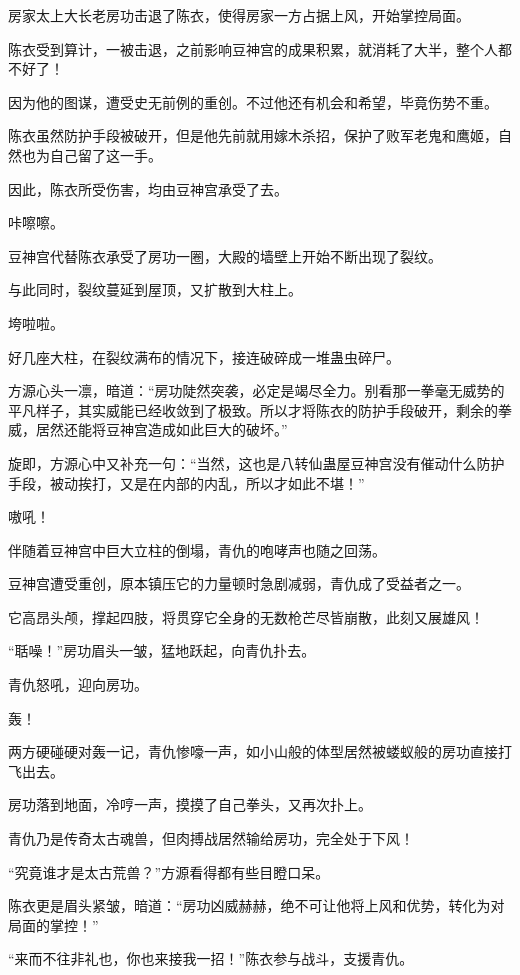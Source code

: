 \begin{this_body}
房家太上大长老房功击退了陈衣，使得房家一方占据上风，开始掌控局面。

陈衣受到算计，一被击退，之前影响豆神宫的成果积累，就消耗了大半，整个人都不好了！

因为他的图谋，遭受史无前例的重创。不过他还有机会和希望，毕竟伤势不重。

陈衣虽然防护手段被破开，但是他先前就用嫁木杀招，保护了败军老鬼和鹰姬，自然也为自己留了这一手。

因此，陈衣所受伤害，均由豆神宫承受了去。

咔嚓嚓。

豆神宫代替陈衣承受了房功一圈，大殿的墙壁上开始不断出现了裂纹。

与此同时，裂纹蔓延到屋顶，又扩散到大柱上。

垮啦啦。

好几座大柱，在裂纹满布的情况下，接连破碎成一堆蛊虫碎尸。

方源心头一凛，暗道：“房功陡然突袭，必定是竭尽全力。别看那一拳毫无威势的平凡样子，其实威能已经收敛到了极致。所以才将陈衣的防护手段破开，剩余的拳威，居然还能将豆神宫造成如此巨大的破坏。”

旋即，方源心中又补充一句：“当然，这也是八转仙蛊屋豆神宫没有催动什么防护手段，被动挨打，又是在内部的内乱，所以才如此不堪！”

嗷吼！

伴随着豆神宫中巨大立柱的倒塌，青仇的咆哮声也随之回荡。

豆神宫遭受重创，原本镇压它的力量顿时急剧减弱，青仇成了受益者之一。

它高昂头颅，撑起四肢，将贯穿它全身的无数枪芒尽皆崩散，此刻又展雄风！

“聒噪！”房功眉头一皱，猛地跃起，向青仇扑去。

青仇怒吼，迎向房功。

轰！

两方硬碰硬对轰一记，青仇惨嚎一声，如小山般的体型居然被蝼蚁般的房功直接打飞出去。

房功落到地面，冷哼一声，摸摸了自己拳头，又再次扑上。

青仇乃是传奇太古魂兽，但肉搏战居然输给房功，完全处于下风！

“究竟谁才是太古荒兽？”方源看得都有些目瞪口呆。

陈衣更是眉头紧皱，暗道：“房功凶威赫赫，绝不可让他将上风和优势，转化为对局面的掌控！”

“来而不往非礼也，你也来接我一招！”陈衣参与战斗，支援青仇。


\end{this_body}
